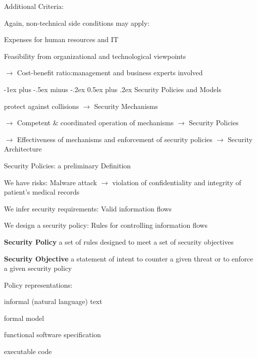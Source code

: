 \documentclass[a4paper]{article}
\makeatletter
\renewcommand{\note}[2]{\begin{noteBox} \textbf{#1} #2 \end{noteBox}}
\renewcommand{\section}{\@startsection{section}{1}{0mm}%
                {-1ex plus -.5ex minus -.2ex}%
                {0.5ex plus .2ex}%
                {\normalfont\large\bfseries}}
\makeatother
\begin{document}
\begin{multicols}{3}
    Additional Criteria:
    \begin{itemize*}
        \item Again, non-technical side conditions may apply:
        \begin{itemize*}
            \item Expenses for human resources and IT
            \item Feasibility from organizational and technological viewpoints
        \end{itemize*}
        \item[$\rightarrow$] Cost-benefit ratio:management and business experts involved
    \end{itemize*}

    \section{Security Policies and Models}
    \begin{itemize*}
        \item protect against collisions $\rightarrow$ Security Mechanisms
        \item[$\rightarrow$] Competent \& coordinated operation of mechanisms $\rightarrow$ Security Policies
        \item[$\rightarrow$] Effectiveness of mechanisms and enforcement of security policies $\rightarrow$ Security Architecture
    \end{itemize*}

    Security Policies: a preliminary Definition
    \begin{itemize*}
        \item We have risks: Malware attack $\rightarrow$ violation of confidentiality and integrity of patient’s medical records
        \item We infer security requirements: Valid information flows
        \item We design a security policy: Rules for controlling information flows
    \end{itemize*}

    \note{Security Policy}{a set of rules designed to meet a set of security objectives}

    \note{Security Objective}{a statement of intent to counter a given threat or to enforce a given security policy}

    Policy representations:
    \begin{itemize*}
        \item informal (natural language) text
        \item formal model
        \item functional software specification
        \item executable code
    \end{itemize*}


\end{multicols}
\end{document}
